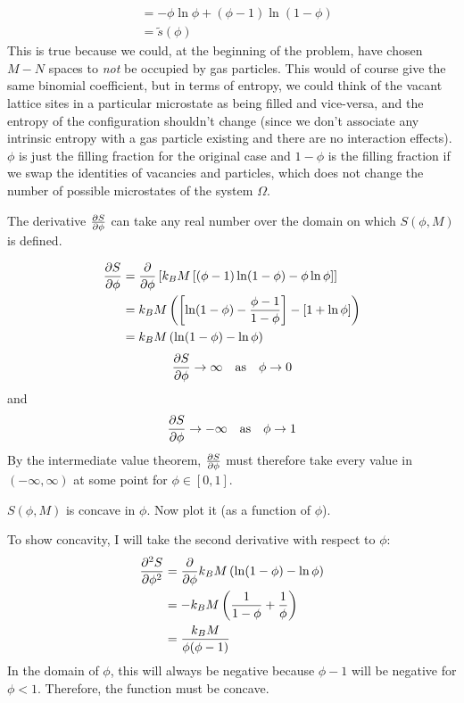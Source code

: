 \documentclass[a4paper,twoside]{article}
\begin{document}
\begin{itemize}
\begin{problem}
\begin{align}
                &= -\phi\ln\phi + (\phi - 1)\ln(1-\phi) \\
                &= \tilde{s}(\phi)
            \end{align}
            This is true because we could, at the beginning of the problem, have chosen $ M - N $ spaces to \textit{not} be occupied by gas particles. This would of course give the same binomial coefficient, but in terms of entropy, we could think of the vacant lattice sites in a particular microstate as being filled and vice-versa, and the entropy of the configuration shouldn't change (since we don't associate any intrinsic entropy with a gas particle existing and there are no interaction effects). $ \phi $ is just the filling fraction for the original case and $ 1-\phi $ is the filling fraction if we swap the identities of vacancies and particles, which does not change the number of possible microstates of the system $ \Omega $.
        \end{problem}
        \subitem[(ii)] The derivative $ \pdv{S}{\phi} $ can take any real number over the domain on which $ S(\phi, M) $ is defined.
        \begin{problem}
            \begin{align}
                \pdv{S}{\phi} &=  \pdv{\phi} \left[ k_B M \left[ (\phi - 1)\ln(1-\phi) - \phi\ln\phi \right] \right]\\
                &= k_B M \left( \left[ \ln(1-\phi) - \frac{\phi-1}{1-\phi} \right] - \left[ 1 + \ln\phi \right] \right)\\
                &= k_B M \left( \ln(1-\phi) - \ln\phi \right)\\
            \end{align}
            \begin{equation}
                \pdv{S}{\phi} \to \infty \qq{as} \phi \to 0
            \end{equation}
            and
            \begin{equation}
                \pdv{S}{\phi} \to - \infty \qq{as} \phi \to 1
            \end{equation}
            By the intermediate value theorem, $ \pdv{S}{\phi} $ must therefore take every value in $ (- \infty, \infty) $ at some point for $ \phi \in [0, 1] $.
        \end{problem}
        \subitem[(iii)] $ S(\phi, M) $ is concave in $ \phi $. Now plot it (as a function of $ \phi $).
        \begin{problem}
            To show concavity, I will take the second derivative with respect to $ \phi $:
            \begin{align}
                \pdv[2]{S}{\phi} &= \pdv{\phi} k_B M \left( \ln(1-\phi) - \ln\phi \right) \\
                &= - k_B M \left( \frac{1}{1-\phi} + \frac{1}{\phi}  \right)\\
                &= \frac{k_B M}{\phi(\phi - 1)}
            \end{align}
            In the domain of $ \phi $, this will always be negative because $ \phi - 1 $ will be negative for $ \phi < 1 $. Therefore, the function must be concave.
            

\end{problem}
\end{itemize}
\end{document}
